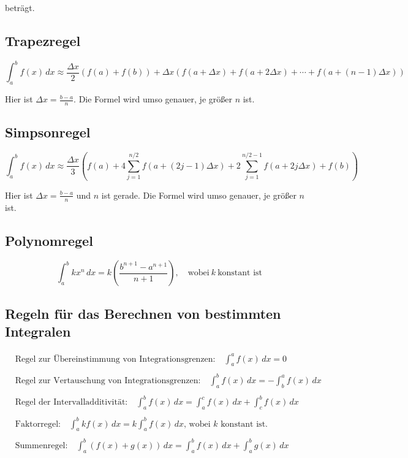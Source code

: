 \documentclass[11pt, openany]{book}
\begin{document}
beträgt.

\subsection{Trapezregel}

\[\int_{a}^{b} f(x) \,dx \approx \frac{\Delta x}{2}(f(a) + f(b)) + \Delta x \left(f(a + \Delta x) + f(a + 2\Delta x) + \cdots + f(a + (n-1)\Delta x)\right)\]

Hier ist \(\Delta x = \frac{b - a}{n}\). Die Formel wird umso genauer, je größer \(n\) ist.

\subsection{Simpsonregel}

\[\int_{a}^{b} f(x) \,dx \approx \frac{\Delta x}{3} \left( f(a) + 4 \sum_{j=1}^{n/2} f(a + (2j - 1) \Delta x) + 2 \sum_{j=1}^{n/2 - 1} f(a + 2j \Delta x) + f(b) \right)\]

Hier ist \(\Delta x = \frac{b - a}{n}\) und \(n\) ist gerade. Die Formel wird umso genauer, je größer \(n\) ist.

\subsection{Polynomregel}
\[
    \int_{a}^{b} kx^n \, dx = k\left(\frac{b^{n+1} - a^{n+1}}{n+1}\right), \quad \text{wobei}~k~\text{konstant ist}
\]

\subsection{Regeln für das Berechnen von bestimmten Integralen}

\begin{align*}
&\text{Regel zur Übereinstimmung von Integrationsgrenzen:} \quad \int_{a}^{a} f(x) \,dx = 0 \\
\\
&\text{Regel zur Vertauschung von Integrationsgrenzen:} \quad \int_{a}^{b} f(x) \,dx = -\int_{b}^{a} f(x) \,dx \\
\\
&\text{Regel der Intervalladditivität:} \quad \int_{a}^{b} f(x) \,dx = \int_{a}^{c} f(x) \,dx + \int_{c}^{b} f(x) \,dx \\
\\
&\text{Faktorregel:} \quad \int_{a}^{b} kf(x) \,dx = k \int_{a}^{b} f(x) \,dx \text{, wobei \(k\) konstant ist.}  \\
\\
&\text{Summenregel:} \quad \int_{a}^{b} (f(x) + g(x)) \,dx = \int_{a}^{b} f(x) \,dx + \int_{a}^{b} g(x) \,dx 
\end{align*}    
\end{document}
